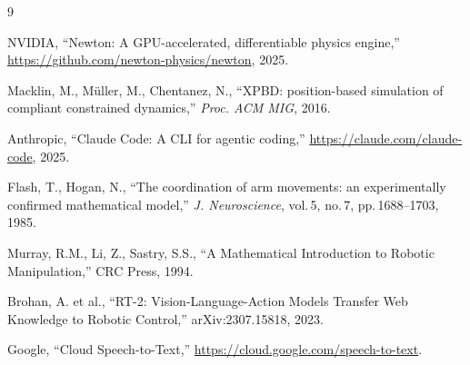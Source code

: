 \documentclass[12pt, a4paper, UTF8]{ctexart}
\begin{document}
\begin{thebibliography}{9}

NVIDIA, ``Newton: A GPU-accelerated, differentiable physics engine,''
\url{https://github.com/newton-physics/newton}, 2025.

Macklin, M., Müller, M., Chentanez, N., ``XPBD: position-based
simulation of compliant constrained dynamics,''
\textit{Proc. ACM MIG}, 2016.

Anthropic, ``Claude Code: A CLI for agentic coding,''
\url{https://claude.com/claude-code}, 2025.

Flash, T., Hogan, N., ``The coordination of arm movements: an
experimentally confirmed mathematical model,''
\textit{J. Neuroscience}, vol.\,5, no.\,7, pp.\,1688--1703, 1985.

Murray, R.M., Li, Z., Sastry, S.S., ``A Mathematical Introduction
to Robotic Manipulation,'' CRC Press, 1994.

Brohan, A. et al., ``RT-2: Vision-Language-Action Models Transfer
Web Knowledge to Robotic Control,'' arXiv:2307.15818, 2023.

Google, ``Cloud Speech-to-Text,''
\url{https://cloud.google.com/speech-to-text}.

\end{thebibliography}
\end{document}
